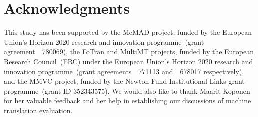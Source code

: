 \documentclass{svjour3}
\begin{document}
\section*{Acknowledgments}
\label{sec:acknowledgments}


This study has been supported by the MeMAD project, funded by the European Union's Horizon 2020 research and innovation programme~(grant agreement~\textnumero{}~780069), the FoTran and MultiMT projects, funded by the European Research Council~(ERC) under the European Union's Horizon 2020 research and innovation programme~(grant agreements~\textnumero{}~771113 and~\textnumero{}~678017 respectively), and the MMVC project, funded by the Newton Fund Institutional Links grant programme~(grant ID 352343575). We would also like to thank Maarit Koponen for her valuable feedback and her help in establishing our discussions of machine translation evaluation. 




\end{document}
